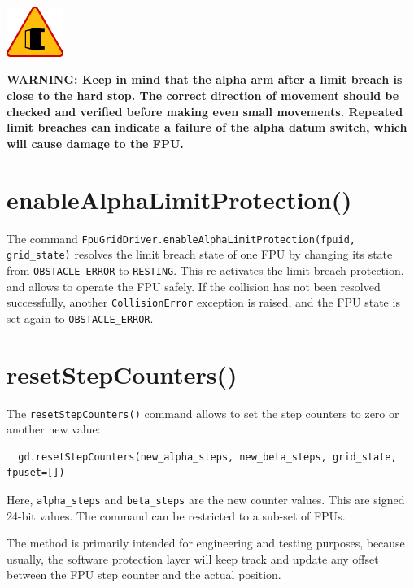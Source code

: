 \documentclass[fontsize=12,a4paper]{scrreprt}
\newenvironment{warning}{\begin{framed}\includegraphics[width=5em]{accident-area-ahead.png}
}{\end{framed}}
\begin{document}
\begin{warning}
  \textbf{WARNING: Keep in mind that the alpha arm after a limit
    breach is close to the hard stop. The correct direction of
    movement should be checked and verified before making even small
    movements. Repeated limit breaches can indicate a failure of the
    alpha datum switch, which will cause damage to the FPU.}
\end{warning}


\section{enableAlphaLimitProtection()}

The command \texttt{FpuGridDriver.enableAlphaLimitProtection(fpuid,
  grid\_state)} resolves the limit breach state of one FPU by changing
its state from \texttt{OBSTACLE\_ERROR} to \texttt{RESTING}.  This
re-activates the limit breach protection, and allows to operate the
FPU safely. If the collision has not been resolved successfully,
another \texttt{CollisionError} exception is raised, and the FPU state
is set again to \texttt{OBSTACLE\_ERROR}.


\section{resetStepCounters()}

The \texttt{resetStepCounters()} command allows to
set the step counters to zero or another new value:

\begin{verbatim}
  gd.resetStepCounters(new_alpha_steps, new_beta_steps, grid_state, fpuset=[])
\end{verbatim}

Here, \texttt{alpha\_steps} and \texttt{beta\_steps} are the new
counter values. This are signed 24-bit values. The command can be
restricted to a sub-set of FPUs.

The method is primarily intended for engineering and testing purposes,
because usually, the software protection layer will keep track and
update any offset between the FPU step counter and the actual
position.
\end{document}
